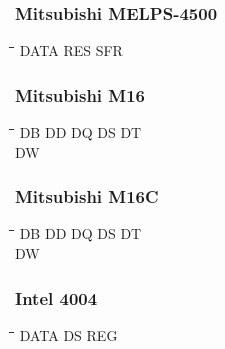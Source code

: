 \subsubsection{Mitsubishi MELPS-4500}
{\tt\begin{tabbing}
\hspace{3cm}\=\hspace{3cm}\=\hspace{3cm}\=\hspace{3cm}\=\kill
DATA       \> RES         \> SFR \\
\end{tabbing}}

\subsubsection{Mitsubishi M16}
{\tt\begin{tabbing}
\hspace{3cm}\=\hspace{3cm}\=\hspace{3cm}\=\hspace{3cm}\=\kill
DB         \> DD          \> DQ          \> DS          \> DT \\
DW \\
\end{tabbing}}

\subsubsection{Mitsubishi M16C}
{\tt\begin{tabbing}
\hspace{3cm}\=\hspace{3cm}\=\hspace{3cm}\=\hspace{3cm}\=\kill
DB         \> DD          \> DQ          \> DS          \> DT \\
DW \\
\end{tabbing}}

\subsubsection{Intel 4004}
{\tt\begin{tabbing}
\hspace{3cm}\=\hspace{3cm}\=\hspace{3cm}\=\hspace{3cm}\=\kill   
DATA       \> DS          \> REG \\
\end{tabbing}}

